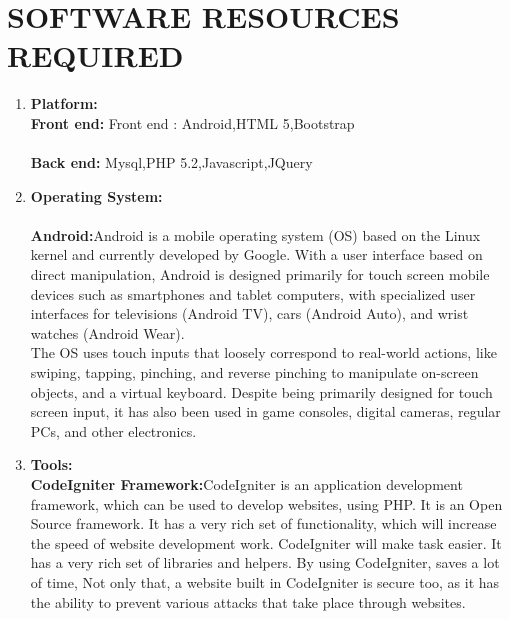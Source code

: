 \documentclass[oneside,a4paper,12pt]{report}
\begin{document}
\section{SOFTWARE RESOURCES REQUIRED}
\begin{enumerate}
\item \textbf{Platform:}\\
\hspace*{0.3in}\textbf{Front end:} Front end : Android,HTML 5,Bootstrap\\
\\
\hspace*{0.3in}\textbf{Back end:} Mysql,PHP 5.2,Javascript,JQuery\\
\newpage
\item \textbf{Operating System:}\\
\\
\hspace*{0.3in}\textbf{Android:}Android is a mobile operating system (OS) based on the Linux kernel and currently developed by Google. With a user interface based on direct manipulation, Android is designed primarily for touch screen mobile devices such as smartphones and tablet computers, with specialized user interfaces for televisions (Android TV), cars (Android Auto), and wrist watches (Android Wear).\\
\hspace*{0.3in}The OS uses touch inputs that loosely correspond to real-world actions, like swiping, tapping, pinching, and reverse pinching to manipulate on-screen objects, and a virtual keyboard. Despite being primarily designed for touch screen input, it has also been used in game consoles, digital cameras, regular PCs, and other electronics.\\


\item \textbf{Tools:}\\
\hspace*{0.3in}\textbf{CodeIgniter Framework:}CodeIgniter  is an application  development framework, which can be used to develop websites, using PHP.  It is an Open Source framework.  It has a very rich set of functionality, which will increase the speed of website development work. CodeIgniter  will make task easier.  It has a very rich set of libraries and helpers.  By using CodeIgniter,  saves a lot of time,  Not only that,  a website built  in CodeIgniter  is secure  too,  as it  has  the  ability  to  prevent various attacks  that  take place through  websites.
\\


\end{enumerate}
\end{document}
